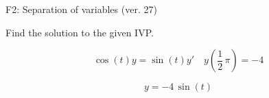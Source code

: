 \begin{exercise}
  \begin{exerciseTitle}F2: Separation of variables (ver. 27)\end{exerciseTitle}
  \begin{exerciseStatement}
    
Find the solution to the given IVP.

    
\[\cos\left(t\right) y= \sin\left(t\right) y'\hspace{1em} y\left( \frac{1}{2} \, \pi \right)= -4\]

  \end{exerciseStatement}
  \begin{exerciseAnswer}
    
\[y= -4 \, \sin\left(t\right)\]

  \end{exerciseAnswer}
\end{exercise}